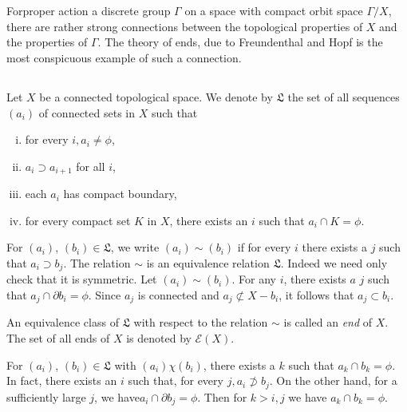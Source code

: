 \chapter{}\label{chap5}%
   
For\pageoriginale proper action a discrete group $\Gamma$ on a space with
compact orbit space $\Gamma / X$, there are rather strong
connections between the topological properties of $X$ and the
properties of $\Gamma$. The theory of ends, due to Freundenthal
\cite{key1} and Hopf \cite{key1} is the most  conspicuous example of such a
connection. 

\section{}%

Let $X$ be a connected topological space. We denote by
$\mathfrak{L}$ the set of all sequences $(a_i)$ of connected sets in
$X$ such that  
\begin{enumerate}[(i)]
\item for every $i, a_i  \neq \phi$,
\item $a_i \supset a_{i+1}$ for all $i$, 
\item each $a_i$ has compact boundary,
\item for every compact set $K$ in $X$, there exists an $i$ such that
  $a_i \cap K= \phi$. 
\end{enumerate} 

For $(a_i)$, $(b_i) \in \mathfrak{L}$, we write $(a_i) \sim (b_i)$
if for every $i$ there exists a $j$  such that $a_i \supset
b_j$. The relation $\sim$ is an equivalence relation
   $\mathfrak{L}$. Indeed we need only check that it is symmetric. Let
   $(a_i) \sim(b_i)$. For any $i$, there exists $a$ $j$ such that $a_j
   \cap \partial b_i = \phi$. Since $a_j$ is connected and $a_j
   \not\subset X -b_i$, it follows that $a_j \subset b_i$. 
   
   An equivalence class of $\mathfrak{L}$ with respect to the relation
   $\sim$ is called an \textit{end} of $X$. The set of all ends of
   $X$ is denoted by $\mathscr{E} (X)$. 
   
\begin{remark*}
  For  $(a_i)$, $(b_i) \in  \mathfrak{L}$ with $(a_i)\chi (b_i)$, there
  exists a $k$ such that $a_k \cap b_k = \phi$. In fact, there exists an
  $i$ such that, for every $j, a_i \not\supset b_j$. On the other hand,
  for a sufficiently large $j$, we have\pageoriginale  $a_i \cap \partial b_j =
  \phi$. Then for $k >  i,j$ we have $a_k \cap b_k = \phi$.   
\end{remark*}  
    
